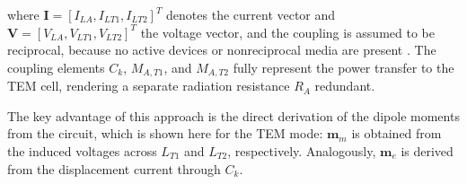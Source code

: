 where $\mathbf{I}=\left[ I_{LA}, I_{LT1}, I_{LT2} \right]^T$ denotes the current vector and $\mathbf{V}=\left[ V_{LA}, V_{LT1}, V_{LT2}  \right]^T$ the voltage vector, and the coupling is assumed to be reciprocal, because no active devices or nonreciprocal media are present \cite[p.~175]{Pozar_2012}. The coupling elements $C_k$, $M_{A,T1}$, and $M_{A,T2}$ fully represent the power transfer to the TEM cell, rendering a separate radiation resistance $R_A$ redundant.

The key advantage of this approach is the direct derivation of the dipole moments from the circuit, which is shown here for the TEM mode: $\mathbf{m}_m$ is obtained from the induced voltages across $L_{T1}$ and $L_{T2}$, respectively. Analogously, $\mathbf{m}_e$ is derived from the displacement current through $C_k$.


